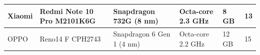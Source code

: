 \begin{ThreePartTable}
\begin{longtable}{@{}P{0.1\textwidth}P{0.20\textwidth}P{0.27\textwidth}P{0.15\textwidth}P{0.10\textwidth}P{0.10\textwidth}@{}}
        Xiaomi &
            Redmi Note 10 Pro M2101K6G &
                Snapdragon 732G (8 nm) &
                    Octa-core 2.3 GHz &
                        8 GB &
                            13 \\

        \midrule

        OPPO &
            Reno14 F CPH2743 &
                Snapdragon 6 Gen 1 (4 nm) &
                    Octa-core 2.2 GHz &
                        12 GB &
                            15 \\

    \end{longtable}

\end{ThreePartTable}